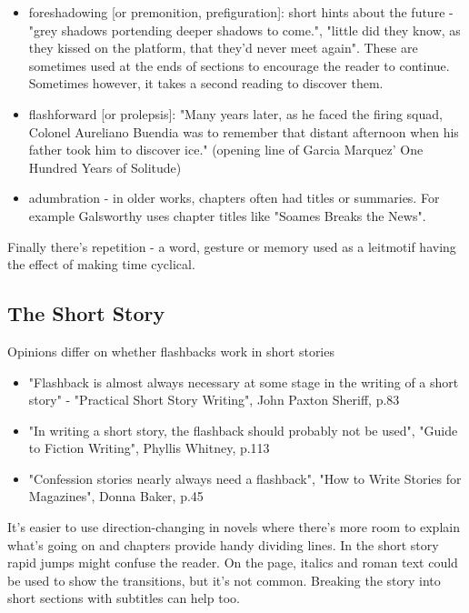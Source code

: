 \documentclass[11pt]{article}
\begin{document}
\begin{itemize}
\item  foreshadowing [or premonition, prefiguration]: short hints about the future - "grey shadows portending deeper shadows to come.", "little did they know, as they kissed on the platform, that they'd never meet again". These are sometimes used at the ends of sections to encourage the reader to continue. Sometimes however, it takes a second reading to discover them.
\item  flashforward [or prolepsis]: "Many years later, as he faced the firing squad, Colonel Aureliano Buendia was to remember that distant afternoon when his father took him to discover ice." (opening line of Garcia Marquez' One Hundred Years of Solitude)
\item  adumbration - in older works, chapters often had titles or summaries. For example Galsworthy uses chapter titles like "Soames Breaks the News".
\end{itemize} 
Finally there's repetition - a word, gesture or memory used as a leitmotif having the effect of making time cyclical.
 


\subsection*{The Short Story}
Opinions differ on whether flashbacks work in short stories


\begin{itemize}
\item  "Flashback is almost always necessary at some stage in the writing of a short story" - "Practical Short Story Writing", John Paxton Sheriff, p.83
\item  "In writing a short story, the flashback should probably not be used", "Guide to Fiction Writing", Phyllis Whitney, p.113
\item  "Confession stories nearly always need a flashback", "How to Write Stories for Magazines", Donna Baker, p.45
\end{itemize}
 
It's easier to use direction-changing in novels where there's more room to explain what's going on and chapters provide handy dividing lines. In the short story rapid jumps might confuse the reader. On the page, italics and roman text could be used to show the transitions, but it's not common. Breaking the story into short sections with subtitles can help too. 
\end{document}
